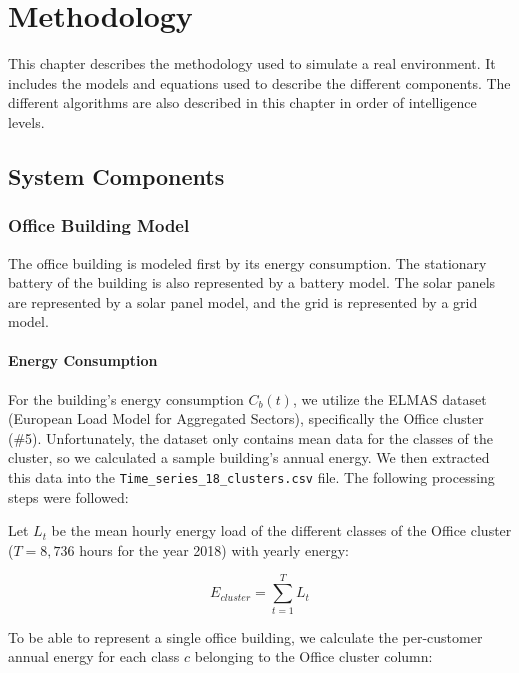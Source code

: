 \chapter{Methodology}
\label{ch:methodology}

This chapter describes the methodology used to simulate a real environment. It includes the models and equations used to describe the different components.
The different algorithms are also described in this chapter in order of intelligence levels. 

\section{System Components}
\label{sec:system_components}

\subsection{Office Building Model}
\label{subsec:building_model}

The office building is modeled first by its energy consumption. The stationary battery of the building is also represented by a battery model. The solar panels are represented by a solar panel model, and the grid is represented by a grid model. 

\subsubsection{Energy Consumption}
For the building's energy consumption $C_b(t)$, we utilize the ELMAS dataset (European Load Model for Aggregated Sectors), specifically the Office cluster (\#5).
Unfortunately, the dataset only contains mean data for the classes of the cluster, so we calculated a sample building's annual energy. We then extracted this data into the \texttt{Time\_series\_18\_clusters.csv} file.
The following processing steps were followed: 

Let $L_t$ be the mean hourly energy load of the different classes of the Office cluster ($T = 8{,}736$ hours for the year 2018) with yearly energy:

\begin{equation}
E_{cluster} = \sum_{t=1}^{T} L_t
\end{equation}

To be able to represent a single office building, we calculate the per-customer annual energy for each class $c$ belonging to the Office cluster column:

